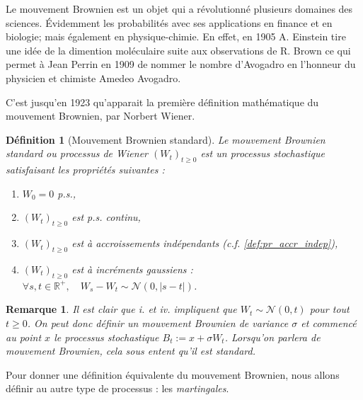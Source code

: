 \documentclass[openany]{book}
\newcommand{\R}{\mathbb{R}}
\newcommand{\1}{\mathbbm{1}}
\theoremstyle{thmfont}
\theoremstyle{deffont}
\newtheorem{definition}[definition]{Définition}
\theoremstyle{thmfont}
\theoremstyle{deffont}
\newtheorem{remark}[remark]{Remarque}
\begin{document}
Le mouvement Brownien est un objet qui a révolutionné plusieurs domaines des sciences. Évidemment les probabilités avec ses applications en finance et en biologie; mais également en physique-chimie. En effet, en 1905 A. Einstein tire une idée de la dimention moléculaire suite aux observations de R. Brown ce qui permet à Jean Perrin en 1909 de nommer le nombre d'Avogadro en l'honneur du physicien et chimiste Amedeo Avogadro.


C'est jusqu'en 1923 qu'apparait la première définition mathématique du mouvement Brownien, par Norbert Wiener.\\

\begin{definition}[Mouvement Brownien standard]  \label{def:MvtBorwnien}
  Le \textit{mouvement Brownien standard} ou \textit{processus de Wiener} $(W_t)_{t\geq0}$ est un processus stochastique satisfaisant les propriétés suivantes :
  \begin{enumerate}
  \item $W_0 = 0$ p.s.,
  \item $(W_t)_{t\geq0}$ est p.s. continu,
  \item $(W_t)_{t\geq0}$ est à accroissements indépendants (c.f. \autoref{def:pr_accr_indep}),
  \item $(W_t)_{t \geq 0}$ est à incréments gaussiens : $\forall s, t \in \R^+,\quad W_s - W_t \sim \mathcal{N}(0,|s-t|)$.
  \end{enumerate}
\end{definition}

\begin{remark}
  Il est clair que \textit{i.} et \textit{iv.} impliquent que $W_t \sim \mathcal{N}(0,t)$ pour tout $t \geq 0$. On peut donc définir un mouvement Brownien de variance $\sigma$ et commencé au point $x$ le processus stochastique $B_t := x + \sigma W_t$. Lorsqu'on parlera de mouvement Brownien, cela sous entent qu'il est standard.
\end{remark}

Pour donner une définition équivalente du mouvement Brownien, nous allons définir au autre type de processus : les \textit{martingales}.
\end{document}
